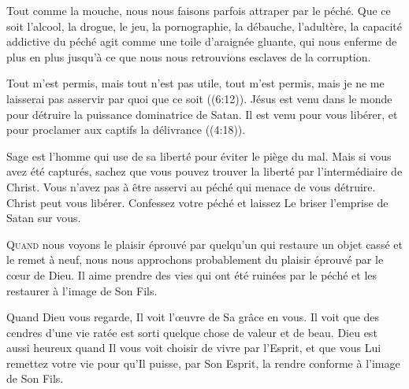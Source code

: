 Tout comme la mouche, nous nous faisons parfois attraper
 par le péché.
 Que ce soit l'alcool, la drogue, le jeu, la pornographie,
 la débauche, l'adultère, la capacité addictive du péché
 agit comme une toile d'araignée gluante, qui nous enferme
 de plus en plus jusqu'à ce que nous nous retrouvions
 esclaves de la corruption. 


\og Tout m'est permis, mais tout n'est pas utile,
 tout m'est permis, mais je ne me laisserai pas asservir
 par quoi que ce soit \fg{} ((6:12)).
 Jésus est venu dans le monde pour détruire
 la puissance dominatrice de Satan.
 Il est venu pour vous libérer,
 et \og pour proclamer aux captifs la délivrance \fg{} ((4:18)).

Sage est l'homme qui use de sa liberté pour éviter le piège du mal.
 Mais si vous avez été capturés, sachez que vous pouvez trouver la liberté
 par l'intermédiaire de Christ.
 Vous n'avez pas à être asservi au péché qui menace de vous détruire.
 Christ peut vous libérer. Confessez votre péché et laissez Le briser
 l'emprise de Satan sur vous. 

\dvrule






\lettrine{Q}{uand} nous voyons le plaisir éprouvé par quelqu'un
 qui restaure un objet cassé et le remet à neuf,
 nous nous approchons probablement du plaisir éprouvé par le c\oe{}ur de Dieu.
 Il aime prendre des vies qui ont été ruinées par le péché
 et les restaurer à l'image de Son Fils. 

Quand Dieu vous regarde, Il voit l'\oe{}uvre de Sa grâce en vous.
 Il voit que des cendres d'une vie ratée est sorti quelque chose
 de valeur et de beau.
 Dieu est aussi heureux quand Il vous voit choisir de vivre par l'Esprit,
 et que vous Lui remettez votre vie pour qu'Il puisse, par Son Esprit,
 la rendre conforme à l'image de Son Fils. 

